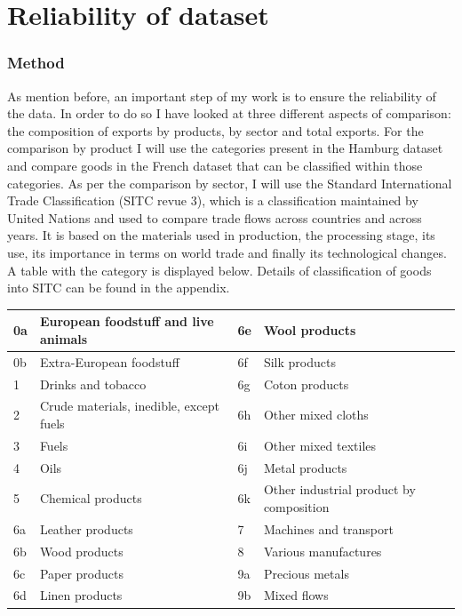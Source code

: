 \documentclass[12pt,a4paper,titlepage]{article}
\begin{document}
\section{Reliability of dataset}
\subsubsection{Method}
As mention before, an important step of my work is to ensure the reliability of the data. In order to do so I have looked at three different aspects of comparison: the composition of exports by products, by sector and total exports. For the comparison by product I will use the categories present in the Hamburg dataset and compare goods in the French dataset that can be classified within those categories. As per the comparison by sector, I will use the Standard International Trade Classification (SITC revue 3), which is a classification maintained by United Nations and used to compare trade flows across countries and across years. It is based on the materials used in production, the processing stage, its use, its importance in terms on world trade and finally its technological changes.  A table with the category is displayed below. Details of classification of goods into SITC can be found in the appendix.

 \label{tab:title} 
\begin{center}
\begin{tabular}{ | l | l | l | l | }
\hline
	0a & European foodstuff and live animals & 6e & Wool products \\ \hline
	0b & Extra-European foodstuff & 6f & Silk products \\ \hline
	1 & Drinks and tobacco & 6g & Coton products \\ \hline
	2 & Crude materials, inedible, except fuels & 6h & Other mixed cloths \\ \hline
	3 & Fuels & 6i & Other mixed textiles \\ \hline
	4 & Oils & 6j & Metal products \\ \hline
	5 & Chemical products & 6k & Other industrial product by composition \\ \hline
	6a & Leather products & 7 & Machines and transport \\ \hline
	6b & Wood products & 8 & Various manufactures \\ \hline
	6c & Paper products & 9a & Precious metals \\ \hline
	6d & Linen products & 9b & Mixed flows \\ \hline
\end{tabular}\\~\\
\end{center}
\end{document}
